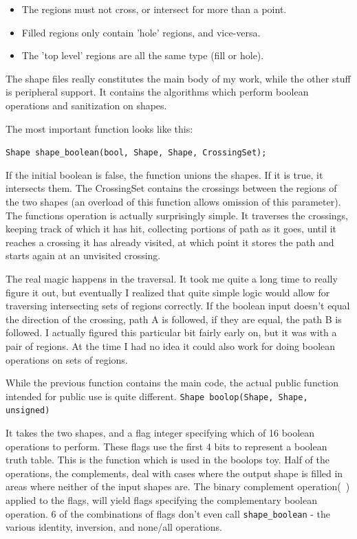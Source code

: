 \documentclass[openany]{book}
\begin{document}
\begin{itemize}
\item{ The regions must not cross, or intersect for more than a point.}
\item{ Filled regions only contain 'hole' regions, and vice-versa.}
\item{ The 'top level' regions are all the same type (fill or hole).}
\end{itemize}

The shape files really constitutes the main body of my work, while the other stuff is peripheral support. It contains the algorithms which perform boolean operations and sanitization on shapes.

The most important function looks like this:

\verb|Shape shape_boolean(bool, Shape, Shape, CrossingSet);|

If the initial boolean is false, the function unions the shapes. If it is true, it intersects them. The CrossingSet contains the crossings between the regions of the two shapes (an overload of this function allows omission of this parameter). The functions operation is actually surprisingly simple. It traverses the crossings, keeping track of which it has hit, collecting portions of path as it goes, until it reaches a crossing it has already visited, at which point it stores the path and starts again at an unvisited crossing.

The real magic happens in the traversal. It took me quite a long time to really figure it out, but eventually I realized that quite simple logic would allow for traversing intersecting sets of regions correctly. If the boolean input doesn't equal the direction of the crossing, path A is followed, if they are equal, the path B is followed. I actually figured this particular bit fairly early on, but it was with a pair of regions. At the time I had no idea it could also work for doing boolean operations on sets of regions.

While the previous function contains the main code, the actual public function intended for public use is quite different.
\verb|Shape boolop(Shape, Shape, unsigned)|

It takes the two shapes, and a flag integer specifying which of 16 boolean operations to perform. These flags use the first 4 bits to represent a boolean truth table. This is the function which is used in the boolops toy. Half of the operations, the complements, deal with cases where the output shape is filled in areas where neither of the input shapes are. The binary complement operation(~) applied to the flags, will yield flags specifying the complementary boolean operation. 6 of the combinations of flags don't even call \verb|shape_boolean| - the various identity, inversion, and none/all operations.
\end{document}
